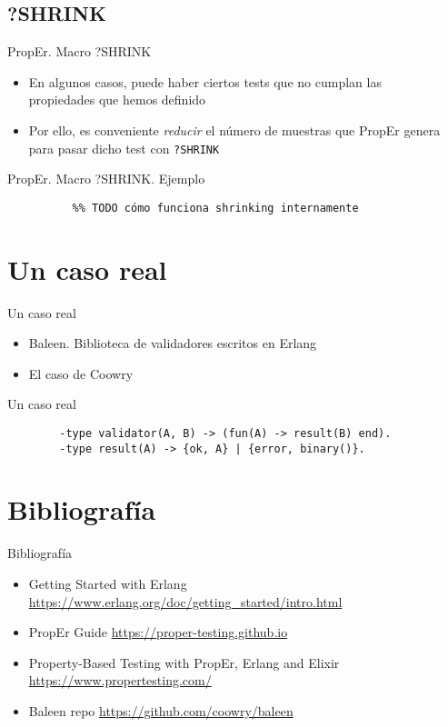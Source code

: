 \documentclass{beamer}
\begin{document}
    \subsection{?SHRINK}
      \begin{frame}{PropEr. Macro ?SHRINK}
        \begin{itemize}
          \item En algunos casos, puede haber ciertos tests que no cumplan las\\
          propiedades que hemos definido
          \item Por ello, es conveniente \textit{reducir} el número de muestras
          que PropEr genera para pasar dicho test con \texttt{?SHRINK}
        \end{itemize}
      \end{frame}

      \begin{frame}[fragile]{PropEr. Macro ?SHRINK. Ejemplo}
        \begin{verbatim}
          %% TODO cómo funciona shrinking internamente
        \end{verbatim}
      \end{frame}

  \section{Un caso real}
    \begin{frame}{Un caso real}
      \begin{itemize}
        \item Baleen. Biblioteca de validadores escritos en Erlang
        \item El caso de Coowry
      \end{itemize}
    \end{frame}

    \begin{frame}[fragile]{Un caso real}
      \begin{verbatim}
        -type validator(A, B) -> (fun(A) -> result(B) end).
        -type result(A) -> {ok, A} | {error, binary()}.
      \end{verbatim}
    \end{frame}

  \section{Bibliografía}
    \begin{frame}{Bibliografía}
      \begin{itemize}
        \item Getting Started with Erlang \url{https://www.erlang.org/doc/getting_started/intro.html}
        \item PropEr Guide \url{https://proper-testing.github.io}
        \item Property-Based Testing with PropEr, Erlang and Elixir \url{https://www.propertesting.com/}
        \item Baleen repo \url{https://github.com/coowry/baleen}
      \end{itemize}
    \end{frame}
\end{document}
